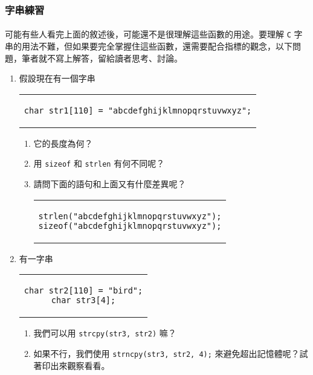 \documentclass[12pt,a4paper,oneside]{article}
\begin{document}
\begin{CJK}{UTF8}{bkai}
\subsubsection{字串練習}

\paragraph{}可能有些人看完上面的敘述後，可能還不是很理解這些函數的用途。要理解 \texttt{C} 字串的用法不難，但如果要完全掌握住這些函數，還需要配合指標的觀念，以下問題，筆者就不寫上解答，留給讀者思考、討論。

\begin{enumerate}
\item 假設現在有一個字串
\begin{code}[h!]
  \centering
  \begin{tabular}{c}
  \begin{lstlisting}
char str1[110] = "abcdefghijklmnopqrstuvwxyz";
  \end{lstlisting}
  \end{tabular}
\end{code}
  \begin{enumerate}
  \item 它的長度為何？
  \item 用 \lstinline!sizeof! 和 \lstinline!strlen! 有何不同呢？
  \item 請問下面的語句和上面又有什麼差異呢？
  \begin{code}[h!]
    \centering
    \begin{tabular}{c}
    \begin{lstlisting}
strlen("abcdefghijklmnopqrstuvwxyz");
sizeof("abcdefghijklmnopqrstuvwxyz");
    \end{lstlisting}
    \end{tabular}
  \end{code}
  \end{enumerate}
\item 有一字串
\begin{code}[h!]
  \centering
  \begin{tabular}{c}
  \begin{lstlisting}
char str2[110] = "bird";
char str3[4];
  \end{lstlisting}
  \end{tabular}
\end{code}
  \begin{enumerate}
  \item 我們可以用 \lstinline!strcpy(str3, str2)! 嘛？
  \item 如果不行，我們使用 \lstinline!strncpy(str3, str2, 4);! 來避免超出記憶體呢？試著印出來觀察看看。

\end{enumerate}
\end{enumerate}
\end{CJK}
\end{document}
